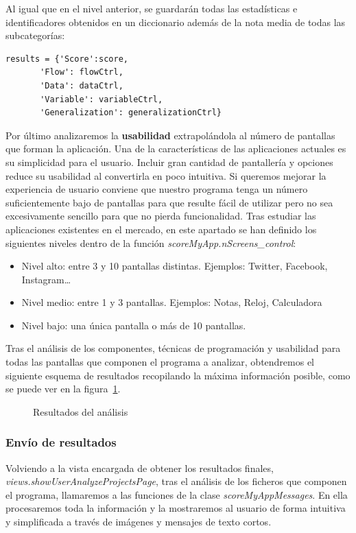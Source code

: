 \documentclass[a4paper, 12pt]{book}
\begin{document}
Al igual que en el nivel anterior, se guardarán todas las estadísticas e identificadores obtenidos en un diccionario además de la nota media de todas las subcategorías:
\begin{lstlisting}
results = {'Score':score,
       'Flow': flowCtrl,
       'Data': dataCtrl,
       'Variable': variableCtrl,
       'Generalization': generalizationCtrl}
\end{lstlisting}

Por último analizaremos la \textbf{usabilidad} extrapolándola al número de pantallas que forman la aplicación. Una de la características de las aplicaciones actuales es su simplicidad para el usuario. Incluir gran cantidad de pantallería y opciones reduce su usabilidad al convertirla en poco intuitiva. Si queremos mejorar la experiencia de usuario conviene que nuestro programa tenga un número suficientemente bajo de pantallas para que resulte fácil de utilizar pero no sea excesivamente sencillo para que no pierda funcionalidad. Tras estudiar las aplicaciones existentes en el mercado, en este apartado se han definido los siguientes niveles dentro de la función \textit{scoreMyApp.nScreens\_control}:

\begin{itemize}
	\item Nivel alto: entre 3 y 10 pantallas distintas. Ejemplos: Twitter, Facebook, Instagram\ldots
	\item Nivel medio: entre 1 y 3 pantallas. Ejemplos: Notas, Reloj, Calculadora
	\item Nivel bajo: una única pantalla o más de 10 pantallas. 
\end{itemize}

Tras el análisis de los componentes, técnicas de programación y usabilidad para todas las pantallas que componen el programa a analizar, obtendremos el siguiente esquema de resultados recopilando la máxima información posible, como se puede ver en la figura~\ref{fig:scoreAppInventor}.
\begin{figure}
  \caption{Resultados del análisis}
  \label{fig:scoreAppInventor}
\end{figure}
\subsubsection{Envío de resultados}
Volviendo a la vista encargada de obtener los resultados finales, \textit{views.showUserAnalyzeProjectsPage}, tras el análisis de los ficheros que componen el programa, llamaremos a las funciones de la clase \textit{scoreMyAppMessages}. En ella procesaremos toda la información y la mostraremos al usuario de forma intuitiva y simplificada a través de imágenes y mensajes de texto cortos. 
 
\end{document}
